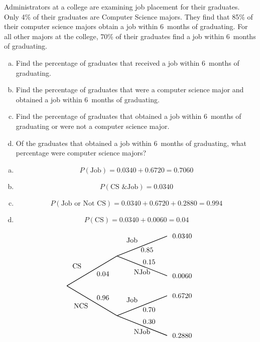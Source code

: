 \documentclass[11pt,letterpaper]{article}
\begin{document}
 Administrators at a college are examining job placement for their graduates. Only 4\% of their graduates are Computer Science majors. They find that 85\% of their computer science majors obtain a job within 6~months of graduating. For all other majors at the college, 70\% of their graduates find a job within 6~months of graduating. 
	\begin{enumerate}[(a)]
	\item Find the percentage of graduates that received a job within 6~months of graduating. 
	\item Find the percentage of graduates that were a computer science major and obtained a job within 6~months of graduating.
	\item Find the percentage of graduates that obtained a job within 6~months of graduating or were not a computer science major. 
	\item Of the graduates that obtained a job within 6~months of graduating, what percentage were computer science majors?	
	\end{enumerate} \pspace

\sol 
\begin{enumerate}[(a)]
\item 
	\[
	P(\text{Job})= 0.0340 + 0.6720= 0.7060
	\] \pspace

\item 
	\[
	P(\text{CS \& Job})= 0.0340
	\] \pspace

\item 
	\[
	P(\text{Job or Not CS})= 0.0340 + 0.6720 + 0.2880= 0.994
	\] \pspace

\item 
	\[
	P(\text{CS})= 0.0340 + 0.0060= 0.04
	\]
\end{enumerate} \pspace

		\[
		\begin{tikzpicture}[scale= 1.0]
		\def\FirstUpLabel{CS}
		\def\FirstDownLabel{NCS}
		\def\SecondUpLabel{Job}
		\def\SecondDownLabel{NJob}
		\def\Up{$0.04$}
		\def\Down{$0.96$}
		\def\UpUp{$0.85$}
		\def\UpDown{$0.15$}
		\def\DownUp{$0.70$}
		\def\DownDown{$0.30$}
		\def\first{$0.0340$}
		\def\second{$0.0060$}
		\def\third{$0.6720$}
		\def\fourth{$0.2880$}
		
		\node at (0.5,1) {\FirstUpLabel};	
		\node at (0.7,-1) {\FirstDownLabel};	
		\node at (1.8,0.6) {\Up};
		\node at (1.8,-0.6) {\Down};
		\draw[thick] (0,0) -- (2.5,1.5);
		\draw[thick] (0,0) -- (2.5,-1.5);
		
		\node at (3.25,2.3) {\SecondUpLabel};
		\node at (3.75,0.7) {\SecondDownLabel};
		\node at (4,1.8) {\UpUp};
		\node at (4.1,1.2) {\UpDown};
		\node at (5.75,2.5) {\first};
		\node at (5.75,0.5) {\second};
		\draw[thick] (2.5,1.5) -- (5,2.5);
		\draw[thick] (2.5,1.5) -- (5,0.5);

		\node at (3.25,-0.7) {\SecondUpLabel};
		\node at (3.75,-2.3) {\SecondDownLabel};
		\node at (4.1,-1.2) {\DownUp};
		\node at (4.1,-1.8) {\DownDown};
		\node at (5.75,-0.5) {\third};	
		\node at (5.75,-2.5) {\fourth};	
		\draw[thick] (2.5,-1.5) -- (5,-0.5);
		\draw[thick] (2.5,-1.5) -- (5,-2.5);
		\end{tikzpicture}
		\]
\end{document}
